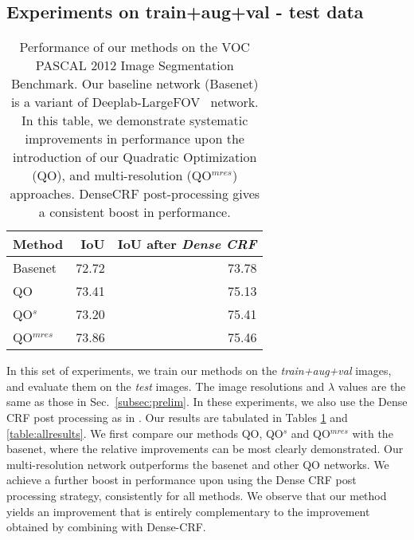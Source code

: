\documentclass[runningheads]{llncs}
\begin{document}
\subsection{Experiments on train+aug+val - test data}
\begin{table}[t]
\centering
 \begin{tabular}{l|r|r}
 \hline
 Method & IoU & IoU after \emph{Dense CRF}\\ \hline
Basenet & 72.72 & 73.78 \\ \hline
QO & 73.41 & 75.13  \\ \hline
QO$^s$ & 73.20 & 75.41  \\ \hline
QO$^{mres}$ & 73.86 & 75.46\\ \hline
  \end{tabular}
  \vspace{2mm}
\caption{Performance of our methods on the VOC PASCAL 2012 Image Segmentation Benchmark. Our baseline network (Basenet) is a variant of Deeplab-LargeFOV~\cite{deeplab1} network.
In this table, we demonstrate systematic improvements in performance upon the introduction of our Quadratic Optimization (QO), and multi-resolution (QO$^{mres}$) approaches. DenseCRF post-processing gives a consistent boost in performance.}
\label{table:results}
\end{table}
In this set of experiments, we train our methods on the \emph{train+aug+val} images, and evaluate them on the \emph{test} images.
The image resolutions and $\lambda$ values are the same as those in Sec.~\ref{subsec:prelim}. In these experiments, we also use the Dense CRF post processing as in \cite{deeplab1,deeplab2}.
Our results are tabulated in Tables \ref{table:results} and \ref{table:allresults}. 
We first compare our methods QO, QO$^s$ and QO$^{mres}$ with the basenet, where the relative improvements can be most clearly demonstrated.
Our multi-resolution network outperforms the basenet and other QO networks. We achieve a further boost in performance upon using the Dense CRF post processing strategy, consistently for all methods. 
We observe that our method yields an improvement that is entirely complementary to the improvement obtained by combining with Dense-CRF.
\end{document}
